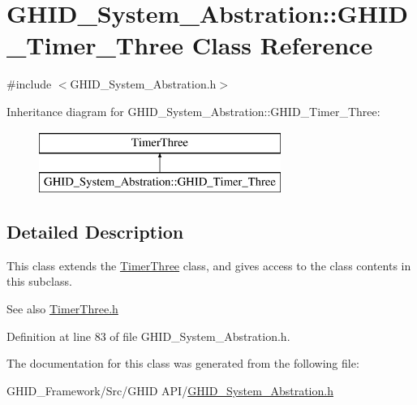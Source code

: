 \hypertarget{class_g_h_i_d___system___abstration_1_1_g_h_i_d___timer___three}{\section{\-G\-H\-I\-D\-\_\-\-System\-\_\-\-Abstration\-:\-:\-G\-H\-I\-D\-\_\-\-Timer\-\_\-\-Three \-Class \-Reference}
\label{class_g_h_i_d___system___abstration_1_1_g_h_i_d___timer___three}
}


{\ttfamily \#include $<$\-G\-H\-I\-D\-\_\-\-System\-\_\-\-Abstration.\-h$>$}

\-Inheritance diagram for \-G\-H\-I\-D\-\_\-\-System\-\_\-\-Abstration\-:\-:\-G\-H\-I\-D\-\_\-\-Timer\-\_\-\-Three\-:\begin{figure}[H]
\begin{center}
\leavevmode
\includegraphics[height=2.000000cm]{class_g_h_i_d___system___abstration_1_1_g_h_i_d___timer___three}
\end{center}
\end{figure}


\subsection{\-Detailed \-Description}
\-This class extends the \hyperlink{class_timer_three}{\-Timer\-Three} class, and gives access to the class contents in this subclass.

\begin{DoxySeeAlso}{\-See also}
\hyperlink{_timer_three_8h}{\-Timer\-Three.\-h} 
\end{DoxySeeAlso}


\-Definition at line 83 of file \-G\-H\-I\-D\-\_\-\-System\-\_\-\-Abstration.\-h.



\-The documentation for this class was generated from the following file\-:\begin{DoxyCompactItemize}
\item 
\-G\-H\-I\-D\-\_\-\-Framework/\-Src/\-G\-H\-I\-D A\-P\-I/\hyperlink{_g_h_i_d___system___abstration_8h}{\-G\-H\-I\-D\-\_\-\-System\-\_\-\-Abstration.\-h}\end{DoxyCompactItemize}
